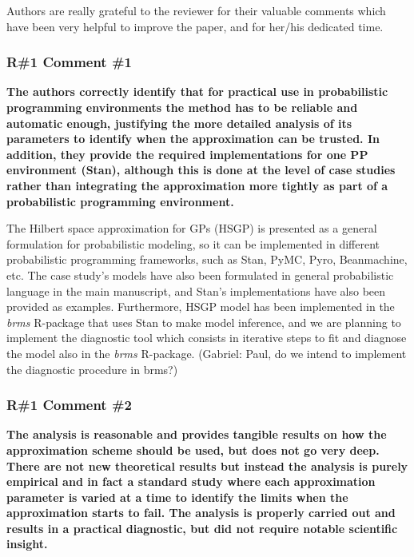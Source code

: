 \documentclass[11pt]{report}
\begin{document}
Authors are really grateful to the reviewer for their valuable comments which have been very helpful to improve the paper, and for her/his dedicated time.

\subsubsection*{R\#1 Comment \#1}

\textbf{The authors correctly identify that for practical use in probabilistic programming environments the method has to be reliable and automatic enough, justifying the more detailed analysis of its parameters to identify when the approximation can be trusted. In addition, they provide the required implementations for one PP environment (Stan), although this is done at the level of case studies rather than integrating the approximation more tightly as part of a probabilistic programming environment.}

The Hilbert space approximation for GPs (HSGP) is presented as a general formulation for probabilistic modeling, so it can be implemented in different probabilistic programming frameworks, such as Stan, PyMC, Pyro, Beanmachine, etc. The case study's models have also been formulated in general probabilistic language in the main manuscript, and Stan's implementations have also been provided as examples. Furthermore, HSGP model has been implemented in the \textit{brms} R-package that uses Stan to make model inference, and we are planning to implement the diagnostic tool which consists in iterative steps to fit and diagnose the model also in the \textit{brms} R-package. {\color{blue}(Gabriel: Paul, do we intend to implement the diagnostic procedure in brms?)}
 

\subsubsection*{R\#1 Comment \#2}

\textbf{The analysis is reasonable and provides tangible results on how the approximation scheme should be used, but does not go very deep. There are not new theoretical results but instead the analysis is purely empirical and in fact a standard study where each approximation parameter is varied at a time to identify the limits when the approximation starts to fail. The analysis is properly carried out and results in a practical diagnostic, but did not require notable scientific insight.}
\end{document}
